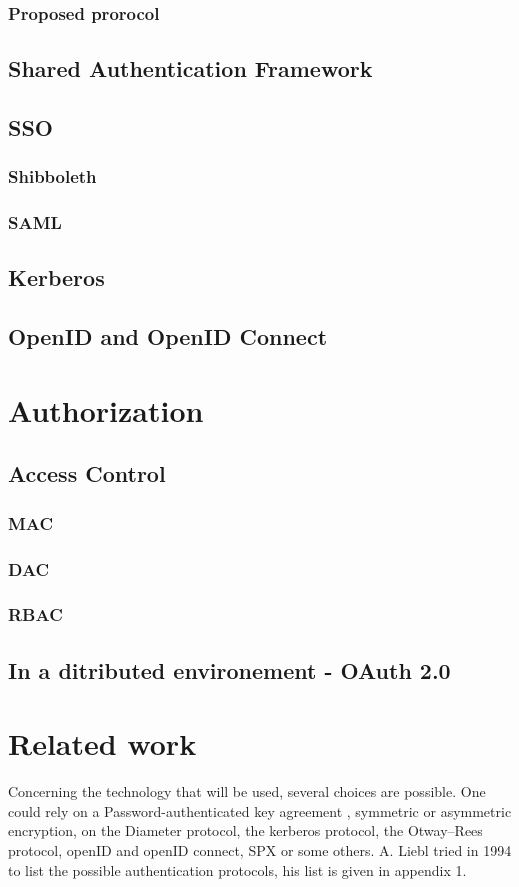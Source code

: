 \subsubsection{Proposed prorocol}
\subsection{Shared Authentication Framework}
\subsection{SSO}
\subsubsection{Shibboleth}
\subsubsection{SAML}
\subsection{Kerberos}
\subsection{OpenID and OpenID Connect}


\section{Authorization}
\subsection{Access Control}
\subsubsection{MAC}
\subsubsection{DAC}
\subsubsection{RBAC}
\subsection{In a ditributed environement - OAuth 2.0}



\section{Related work}
Concerning the technology that will be used, several choices are possible. One could rely on a Password-authenticated key agreement \cite{Hao2011}\cite{Pointcheval2012}\cite{Juang2008}, symmetric or asymmetric encryption\cite{Woo1997}\cite{Denning1982}, on the Diameter protocol, the kerberos protocol\cite{Sundareswaran}, the Otway–Rees protocol, openID\cite{Ghazizadeh} and openID connect, SPX\cite{Tardo1991} or some others. A. Liebl tried in 1994 to list the possible authentication protocols, his list is given in appendix 1.